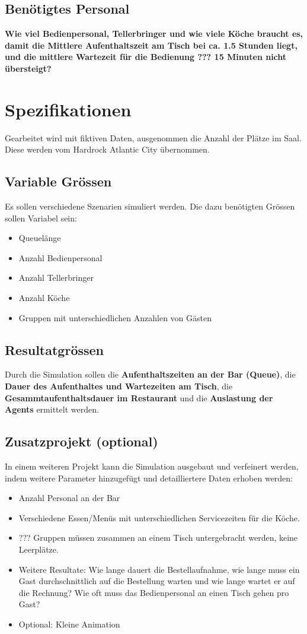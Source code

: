 \documentclass[ngerman,a4paper,12pt]{scrreprt}
\begin{document}
	\subsection{Benötigtes Personal}
		\textbf{Wie viel Bedienpersonal, Tellerbringer und wie viele Köche braucht es, damit die Mittlere Aufenthaltszeit am Tisch bei ca. 1.5 Stunden liegt, und die mittlere Wartezeit für die Bedienung ??? 15 Minuten nicht übersteigt?} \\


\section{Spezifikationen}
	Gearbeitet wird mit fiktiven Daten, ausgenommen die Anzahl der Plätze im Saal. Diese werden vom Hardrock Atlantic City übernommen.

	\subsection{Variable Grössen}
		Es sollen verschiedene Szenarien simuliert werden. Die dazu benötigten Grössen sollen Variabel sein:
		\begin{itemize}
			\item Queuelänge
			\item Anzahl Bedienpersonal
			\item Anzahl Tellerbringer
			\item Anzahl Köche
			\item Gruppen mit unterschiedlichen Anzahlen von Gästen
		\end{itemize}

	\subsection{Resultatgrössen}
		Durch die Simulation sollen die \textbf{Aufenthaltszeiten an der Bar (Queue)}, die \textbf{Dauer des Aufenthaltes und Wartezeiten am Tisch}, die \textbf{Gesammtaufenthaltsdauer im Restaurant} und die \textbf{Auslastung der Agents} ermittelt werden.

\subsection{Zusatzprojekt (optional)}
	In einem weiteren Projekt kann die Simulation ausgebaut und verfeinert werden, indem weitere Parameter hinzugefügt  und detailliertere Daten erhoben werden:
	\begin{itemize}
		\item Anzahl Personal an der Bar
		\item Verschiedene Essen/Menüs mit unterschiedlichen Servicezeiten für die Köche.
		\item ??? Gruppen müssen zusammen an einem Tisch untergebracht werden, keine Leerplätze.
		\item Weitere Resultate: Wie lange dauert die Bestellaufnahme, wie lange muss ein Gast durchschnittlich auf die Bestellung warten und wie lange wartet er auf die Rechnung? Wie oft muss das Bedienpersonal an einen Tisch gehen pro Gast?
		\item Optional: Kleine Animation
	\end{itemize}
\end{document}
